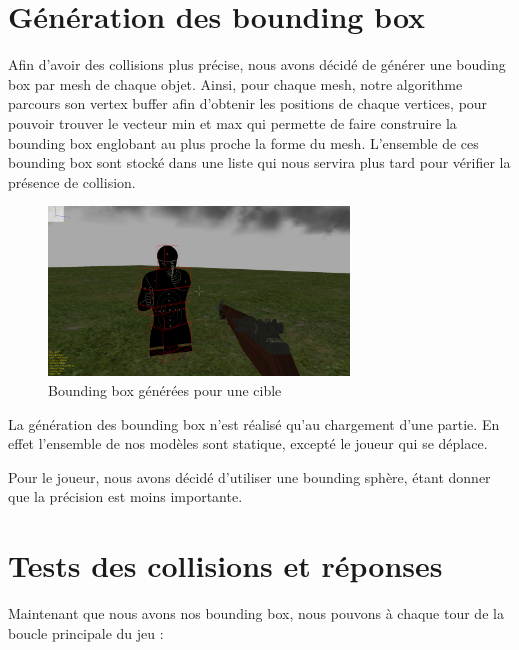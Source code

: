 \documentclass[11pt]{report}
\begin{document}
\section{Génération des bounding box}

Afin d'avoir des collisions plus précise, nous avons décidé de générer une bouding box par mesh de chaque objet. Ainsi, pour chaque mesh, notre algorithme parcours son vertex buffer afin d'obtenir les positions de chaque vertices, pour pouvoir trouver le vecteur min et max qui permette de faire construire la bounding box englobant au plus proche la forme du mesh. L'ensemble de ces bounding box sont stocké dans une liste qui nous servira plus tard pour vérifier la présence de collision.

\begin{figure}[htbp]
\centering
\includegraphics[width=8cm]{multiple-box.png}
\caption{Bounding box générées pour une cible}
\end{figure}

La génération des bounding box n'est réalisé qu'au chargement d'une partie. En effet l'ensemble de nos modèles sont statique, excepté le joueur qui se déplace.

Pour le joueur, nous avons décidé d'utiliser une bounding sphère, étant donner que la précision est moins importante.

\section{Tests des collisions et réponses}

Maintenant que nous avons nos bounding box, nous pouvons à chaque tour de la boucle principale du jeu :
\end{document}
